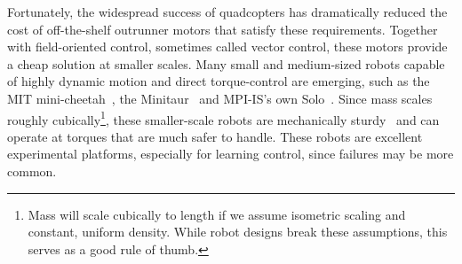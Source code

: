 Fortunately, the widespread success of quadcopters has dramatically reduced the cost of off-the-shelf outrunner motors that satisfy these requirements. Together with field-oriented control, sometimes called vector control, these motors provide a cheap solution at smaller scales. Many small and medium-sized robots capable of highly dynamic motion and direct torque-control are emerging, such as the MIT mini-cheetah~\cite{katz2019mini}, the Minitaur~\cite{kenneally2016design} and MPI-IS's own Solo~\cite{grimminger2019open}. Since mass scales roughly cubically\footnote{Mass will scale cubically to length if we assume isometric scaling and constant, uniform density. While robot designs break these assumptions, this serves as a good rule of thumb.}, these smaller-scale robots are mechanically sturdy~\cite{biewener2005biomechanical} and can operate at torques that are much safer to handle. These robots are excellent experimental platforms, especially for learning control, since failures may be more common. \par





